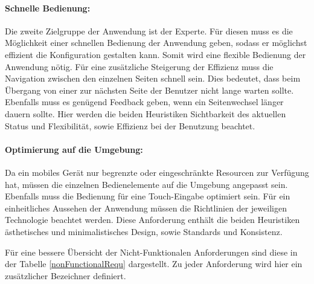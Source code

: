 \paragraph{Schnelle Bedienung:} Die zweite Zielgruppe der Anwendung ist der Experte. Für diesen muss es die Möglichkeit einer schnellen Bedienung der Anwendung geben, sodass er möglichst effizient die Konfiguration gestalten kann. Somit wird eine flexible Bedienung der Anwendung nötig. Für eine zusätzliche Steigerung der Effizienz muss die Navigation zwischen den einzelnen Seiten schnell sein. Dies bedeutet, dass beim Übergang von einer zur nächsten Seite der Benutzer nicht lange warten sollte. Ebenfalls muss es genügend Feedback geben, wenn ein Seitenwechsel länger dauern sollte. Hier werden die beiden Heuristiken Sichtbarkeit des aktuellen Status und Flexibilität, sowie Effizienz bei der Benutzung beachtet.

\paragraph{Optimierung auf die Umgebung: } Da ein mobiles Gerät nur begrenzte oder eingeschränkte Resourcen zur Verfügung hat, müssen die einzelnen Bedienelemente auf die Umgebung angepasst sein. Ebenfalls muss die Bedienung für eine Touch-Eingabe optimiert sein. 
Für ein einheitliches Aussehen der Anwendung müssen die Richtlinien der jeweiligen Technologie beachtet werden. Diese Anforderung enthält die beiden Heuristiken ästhetisches und minimalistisches Design, sowie Standards und Konsistenz.

Für eine bessere Übersicht der Nicht-Funktionalen Anforderungen sind diese in der Tabelle \ref{nonFunctionalRequ} dargestellt. Zu jeder Anforderung wird hier ein zusätzlicher Bezeichner definiert.

